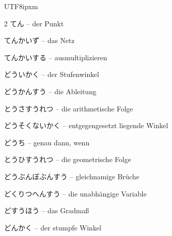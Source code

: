 \begin{CJK}{UTF8}{ipxm}
\begin{multicols}{2}
 {\footnotesize\color{black!70}てん} -- der Punkt\dotfill\hyperref[e:146]{\pageref*{e:146}}\par
{} {\footnotesize\color{black!70}てんかいず} -- das Netz\dotfill\hyperref[e:253]{\pageref*{e:253}}\par
{} {\footnotesize\color{black!70}てんかいする} -- ausmultiplizieren\dotfill\hyperref[e:91]{\pageref*{e:91}}\par
{} {\footnotesize\color{black!70}どういかく} -- der Stufenwinkel\dotfill\hyperref[e:167]{\pageref*{e:167}}\par
{} {\footnotesize\color{black!70}どうかんすう} -- die Ableitung\dotfill\hyperref[e:273]{\pageref*{e:273}}\par
{} {\footnotesize\color{black!70}とうさすうれつ} -- die arithmetische Folge\dotfill\hyperref[e:259]{\pageref*{e:259}}\par
{} {\footnotesize\color{black!70}どうそくないかく} -- entgegengesetzt liegende Winkel\dotfill\hyperref[e:169]{\pageref*{e:169}}\par
{} {\footnotesize\color{black!70}どうち} -- genau dann, wenn\dotfill\hyperref[e:351]{\pageref*{e:351}}\par
{} {\footnotesize\color{black!70}とうひすうれつ} -- die geometrische Folge\dotfill\hyperref[e:260]{\pageref*{e:260}}\par
{} {\footnotesize\color{black!70}どうぶんぼぶんすう} -- gleichnamige Brüche\dotfill\hyperref[e:34]{\pageref*{e:34}}\par
{} {\footnotesize\color{black!70}どくりつへんすう} -- die unabhängige Variable\dotfill\hyperref[e:106]{\pageref*{e:106}}\par
{} {\footnotesize\color{black!70}どすうほう} -- das Gradmaß\dotfill\hyperref[e:138]{\pageref*{e:138}}\par
{} {\footnotesize\color{black!70}どんかく} -- der stumpfe Winkel\dotfill\hyperref[e:159]{\pageref*{e:159}}\par


\end{multicols}
\end{CJK}
